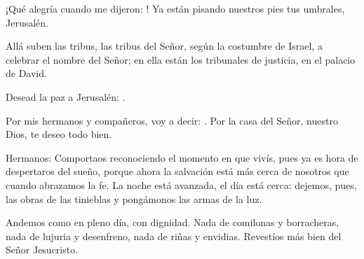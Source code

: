 		
		\begin{psbody}
			¡Qué alegría cuando me dijeron: 
			! 
			Ya están pisando nuestros pies 
			tus umbrales, Jerusalén. 
			
			Allá suben las tribus, 
			las tribus del Señor, 
			según la costumbre de Israel, 
			a celebrar el nombre del Señor; 
			en ella están los tribunales de justicia, 
			en el palacio de David.
			
			Desead la paz a Jerusalén: 
			.
		
			Por mis hermanos y compañeros, 
			voy a decir: . 
			Por la casa del Señor, 
			nuestro Dios, te deseo todo bien.
		\end{psbody}
	
		
		 
		
		
		\begin{scripture}
			
			Hermanos: Comportaos reconociendo el momento en que vivís, pues ya es hora de despertaros del sueño, porque ahora la salvación está más cerca de nosotros que cuando abrazamos la fe. La noche está avanzada, el día está cerca: dejemos, pues, las obras de las tinieblas y pongámonos las armas de la luz. 
			
			Andemos como en pleno día, con dignidad. Nada de comilonas y borracheras, nada de lujuria y desenfreno, nada de riñas y envidias. Revestíos más bien del Señor Jesucristo.
		\end{scripture}
	
		
		 
		
		
